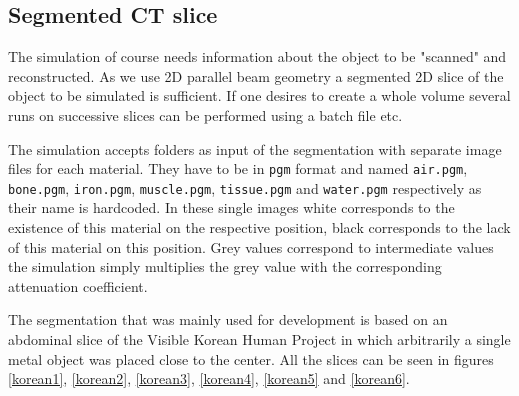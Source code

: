 \subsection{Segmented CT slice}
\par The simulation of course needs information about the object to be "scanned" and reconstructed. As we use 2D parallel beam geometry a segmented 2D slice of the object to be simulated is sufficient. If one desires to create a whole volume several runs on successive slices can be performed using a batch file etc.
\par The simulation accepts folders as input of the segmentation with separate image files for each material. They have to be in \verb!pgm! format and named \verb!air.pgm!, \verb!bone.pgm!, \verb!iron.pgm!, \verb!muscle.pgm!, \verb!tissue.pgm! and \verb!water.pgm! respectively as their name is hardcoded. In these single images white corresponds to the existence of this material on the respective position, black corresponds to the lack of this material on this position. Grey values correspond to intermediate values the simulation simply multiplies the grey value with the corresponding attenuation coefficient.
\par The segmentation that was mainly used for development is based on an abdominal slice of the Visible Korean Human Project\cite{visibleKorean} in which arbitrarily a single metal object was placed close to the center. All the slices can be seen in figures \ref{korean1}, \ref{korean2}, \ref{korean3}, \ref{korean4}, \ref{korean5} and \ref{korean6}.

